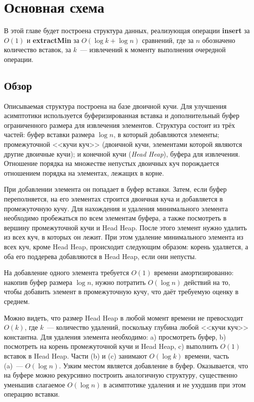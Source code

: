 

\chapter{Основная схема} \label{chapt1}

В этой главе будет построена структура данных, реализующая операции \textbf{insert}
за $O(1)$ и \textbf{extractMin} за $O(\log k + \log n)$ сравнений, где
за $n$ обозначено количество вставок, за $k$~--- извлечений к моменту выполнения
очередной операции.

\section{Обзор}
Описываемая структура построена на базе двоичной кучи. Для улучшения
асимптотики используется буферизированная вставка и дополнительный буфер
ограниченного размера для извлечения элементов. Структура состоит из трёх
частей: буфер вставки размера $\log n$, в который добавляются элементы; промежуточной
<<кучи куч>> (двоичной кучи, элементами которой являются другие двоичные кучи);
и конечной кучи (\emph{Head Heap}), буфера для извлечения. Отношение порядка
на множестве непустых двоичных куч порождается отношением порядка на элементах,
лежащих в корне.

При добавлении элемента он попадает в буфер вставки. Затем, если буфер переполняется,
на его элементах строится двоичная куча и добавляется в промежуточную кучу.
Для нахождения и удаления минимального элемента необходимо пробежаться по всем
элементам буфера, а также посмотреть в вершину промежуточной кучи и Head Heap.
После этого элемент нужно удалить из всех куч, в которых он лежит. При этом
удаление минимального элемента из всех куч, кроме Head Heap, происходит следующим образом:
корень удаляется, а оба его поддерева добавляются в Head Heap, если они непусты.

На добавление одного элемента требуется $O(1)$ времени амортизированно: накопив
буфер размера $\log n$, нужно потратить $O(\log n)$ действий на то, чтобы добавить
элемент в промежуточную кучу, что даёт требуемую оценку в среднем.

Можно видеть, что размер Head Heap в любой момент времени не превосходит $O(k)$, где
$k$~--- количество удалений, поскольку глубина любой <<кучи куч>> константна.
Для удаления элемента необходимо: a) просмотреть буфер, b) посмотреть
на корень промежуточной кучи и Head Heap, c) выполнить $O(1)$ вставок в Head Heap.
Части (b) и (c) занимают $O(\log k)$ времени, часть (a)~--- $O(\log n)$.
Узким местом является добавление в буфер. Оказывается, что на буфере можно
рекурсивно построить аналогичную структуру, существенно уменьшив слагаемое
$O(\log n)$ в асимптотике удаления и не ухудшив при этом операцию вставки.

